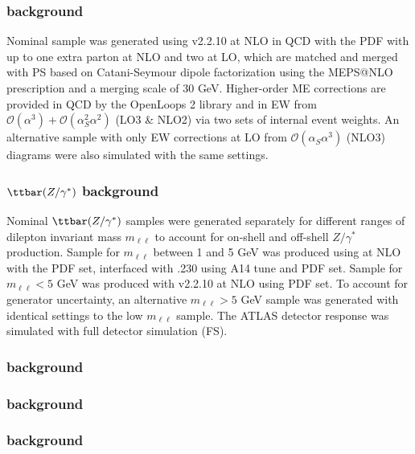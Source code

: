 \documentclass[../thesis.tex]{subfiles}
\begin{document}
\subsubsection*{\ttW background}
Nominal \ttW sample was generated using \sherpa v2.2.10 \citep{Bothmann:2019yzt} at \acs{NLO} in \acs{QCD} with the \nnpdfnnlo \citep{Ball:2014uwa} \acs{PDF} with up to one extra parton at \acs{NLO} and two at \acs{LO}, which are matched and merged with \sherpa \acs{PS} based on Catani-Seymour dipole factorization \citep{Schumann:2007mg} using the MEPS@NLO prescription \citep{Hoeche:2011fd, Hoeche:2012yf, Catani:2001cc, Hoeche:2009rj} and a merging scale of 30 GeV. Higher-order \acs{ME} corrections are provided in \acs{QCD} by the OpenLoops 2 library \citep{Cascioli:2011va, Denner:2016kdg, Buccioni:2019sur} and in \acs{EW} from $\mathcal{O}(\alpha^3)+\mathcal{O}(\alpha^2_S\alpha^2)$ (LO3 \& NLO2) via two sets of internal event weights. An alternative sample with only \acs{EW} corrections at \acs{LO} from $\mathcal{O}(\alpha_S\alpha^3)$ (NLO3) diagrams were also simulated with the same settings.
\subsubsection*{$\ttbar(Z/\gamma^*)$ background}
Nominal $\ttbar(Z/\gamma^*)$ samples were generated separately for different ranges of dilepton invariant mass $m_{\ell\ell}$ to account for on-shell and off-shell $Z/\gamma^*$ production. Sample for $m_{\ell\ell}$ between 1 and 5 GeV was produced using \mgamc \citep{Alwall:2014hca} at \acs{NLO} with the \nnpdfnlo \citep{Ball:2014uwa} \acs{PDF} set, interfaced with \pythia.230 \citep{Sjostrand:2014zea} using A14 tune \citep{ATL-PHYS-PUB-2014-021} and \nnpdftwo \acs{PDF} set. Sample for $m_{\ell\ell} < 5$ GeV was produced with \sherpa v2.2.10 \citep{Bothmann:2019yzt} at \acs{NLO} using \nnpdfnnlo \acs{PDF} set. To account for generator uncertainty, an alternative $m_{\ell\ell}>5$ GeV sample was generated with identical settings to the low $m_{\ell\ell}$ sample. The ATLAS detector response was simulated with full detector simulation (\acs{FS}).
\subsubsection*{\ttH background}
\subsubsection*{\ttt background}
\subsubsection*{\ttbar background}
\end{document}
